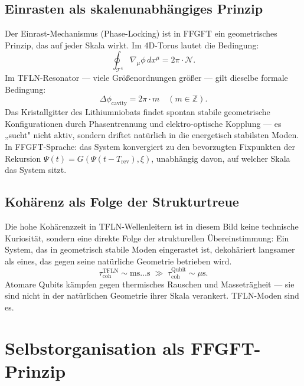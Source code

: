 \subsection{Einrasten als skalenunabhängiges Prinzip}

Der Einrast-Mechanismus (Phase-Locking) ist in FFGFT ein geometrisches
Prinzip, das auf jeder Skala wirkt. Im 4D-Torus lautet die Bedingung:
\begin{equation}
  \oint_{\mathcal{T}^4} \nabla_{\mu}\phi\,dx^\mu = 2\pi\cdot\mathcal{N}.
\end{equation}
Im TFLN-Resonator — viele Größenordnungen größer — gilt dieselbe
formale Bedingung:
\begin{equation}
  \Delta\phi_{\text{cavity}} = 2\pi\cdot m \quad (m \in \mathbb{Z}).
\end{equation}
Das Kristallgitter des Lithiumniobats findet spontan stabile geometrische
Konfigurationen durch Phasentrennung und elektro-optische Kopplung —
es „sucht" nicht aktiv, sondern driftet natürlich in die energetisch
stabilsten Moden. In FFGFT-Sprache: das System konvergiert zu den
bevorzugten Fixpunkten der Rekursion $\Psi(t) = G(\Psi(t-T_{\text{rev}}), \xi)$,
unabhängig davon, auf welcher Skala das System sitzt.

\subsection{Kohärenz als Folge der Strukturtreue}

Die hohe Kohärenzzeit in TFLN-Wellenleitern ist in diesem Bild keine
technische Kuriosität, sondern eine direkte Folge der strukturellen
Übereinstimmung: Ein System, das in geometrisch stabile Moden eingerastet
ist, dekohäriert langsamer als eines, das gegen seine natürliche Geometrie
betrieben wird.
\begin{equation}
  \tau_{\text{coh}}^{\text{TFLN}} \sim \text{ms}\ldots\text{s}
  \;\gg\;
  \tau_{\text{coh}}^{\text{Qubit}} \sim \mu\text{s}.
\end{equation}
Atomare Qubits kämpfen gegen thermisches Rauschen und Masseträgheit —
sie sind nicht in der natürlichen Geometrie ihrer Skala verankert.
TFLN-Moden sind es.

\section{Selbstorganisation als FFGFT-Prinzip}

